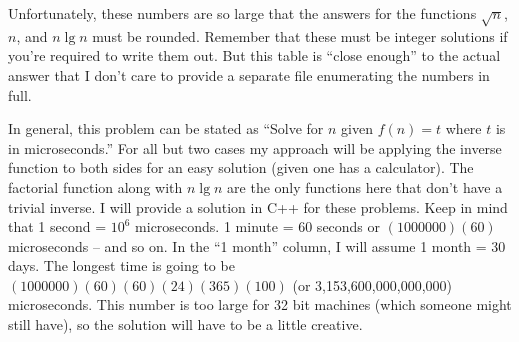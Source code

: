 Unfortunately, these numbers are so large that the answers for the functions $\sqrt{n}$, $n$, and $n\lg{n}$ must be 
rounded. Remember that these must be integer solutions if you're required to write them out. But this table is ``close 
enough'' to the actual answer that I don't care to provide a separate file enumerating the numbers in full.

In general, this problem can be stated as ``Solve for $n$ given $f(n) = t$ where $t$ is in microseconds.'' For all but
two cases my approach will be applying the inverse function to both sides for an easy solution (given one has a 
calculator). The factorial function along with $n\lg{n}$ are the only functions here that don't have a trivial inverse. 
I will provide a solution in C++ for these problems. Keep in mind that 1 second = $10^6$ microseconds. 1 minute = 60 
seconds or $(1000000)(60)$ microseconds -- and so on. In the ``1 month'' column, I will assume 1 month = 30 days. The 
longest time is going to be $(1000000)(60)(60)(24)(365)(100)$ (or 3,153,600,000,000,000) microseconds. This number is 
too large for 32 bit machines (which someone might still have), so the solution will have to be a little creative.
\solid